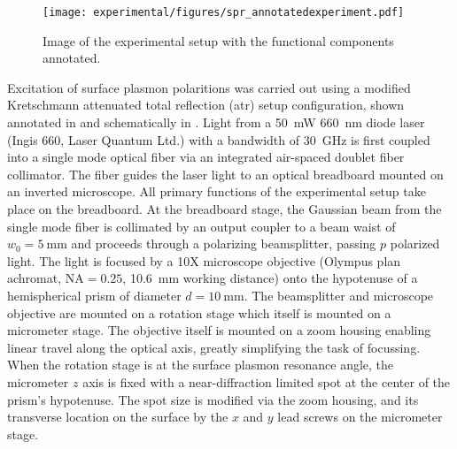 \begin{figure}[ht]
  \centering
  \texttt{[image: experimental/figures/spr\_annotatedexperiment.pdf]}
  \caption{Image of the experimental setup with the functional components annotated.}
  \label{fig:experimentalpicture}
\end{figure}

Excitation of surface plasmon polaritions was carried out using a modified
Kretschmann attenuated total reflection (\gls{atr}) setup configuration, shown
annotated in  and schematically in
.  Light from a \SI{50}{\milli\watt}
\SI{660}{\nano\meter} diode laser (Ingis 660, Laser Quantum Ltd.) with
a bandwidth of \SI{30}{\giga\hertz} is first coupled into a single mode
optical fiber via an integrated air-spaced doublet fiber collimator.  The
fiber guides the laser light to an optical breadboard mounted on an inverted
microscope.  All primary functions of the experimental setup take place on the
breadboard.  At the breadboard stage, the Gaussian beam from the single mode
fiber is collimated by an output coupler to a beam waist of
$w_0=\SI{5}{\milli\meter}$ and proceeds through a polarizing beamsplitter,
passing $p$ polarized light.  The light is focused by a 10X microscope
objective (Olympus plan achromat, $\mathrm{NA}=0.25$, \SI{10.6}{\milli\meter}
working distance) onto the hypotenuse of a hemispherical prism of diameter
$d=\SI{10}{\milli\meter}$.  The beamsplitter and microscope objective are
mounted on a rotation stage which itself is mounted on a micrometer stage.
The objective itself is mounted on a zoom housing enabling linear travel along
the optical axis, greatly simplifying the task of focussing.  When the
rotation stage is at the surface plasmon resonance angle, the micrometer $z$
axis is fixed with a near-diffraction limited spot at the center of the
prism's hypotenuse.  The spot size is modified via the zoom housing, and its
transverse location on the surface by the $x$ and $y$ lead screws on the
micrometer stage.

